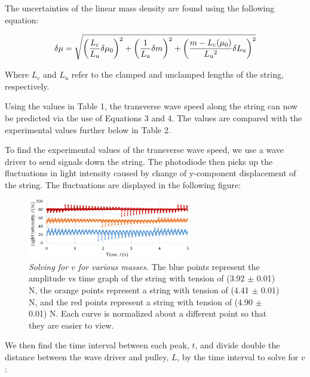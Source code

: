\documentclass[twoside,twocolumn]{article}
\begin{document}
\noindent The uncertainties of the linear mass density are found using the following equation:

\footnotesize
\begin{equation}
\delta \mu = \sqrt{\bigg (\frac{L\textsubscript{c}}{L\textsubscript{u}} \delta \mu_0 \bigg)^2 + \bigg ( \frac{1}{L\textsubscript{u}}\delta m \bigg )^2  + \bigg( \frac{m - L\textsubscript{c}(\mu_0)}{L\textsubscript{u}^2}\delta L\textsubscript{u} \bigg )^2}
\end{equation}
\normalsize

\noindent Where $L_c$ and $L_u$ refer to the clamped and unclamped lengths of the string, respectively.

\noindent Using the values in Table 1, the transverse wave speed along the string can now be predicted via the use of Equations 3 and 4. The values are compared with the experimental values further below in Table 2.

\noindent To find the experimental values of the transverse wave speed, we use a wave driver to send signals down the string. The photodiode then picks up the fluctuations in light intensity caused by change of y-component displacement of the string. The fluctuations are displayed in the following figure:

\begin{figure}[!htbp]
    \centering
    \includegraphics[width=2.8in]{LightIntensity.png}
    \caption{\textit{Solving for $v$ for various masses.} The blue points represent the amplitude vs time graph of the string with tension of (3.92 $\pm$ 0.01) N, the orange points represent a string with tension of (4.41 $\pm$ 0.01) N, and the red points represent a string with tension of (4.90 $\pm$ 0.01) N. Each curve is normalized about a different point so that they are easier to view.}
\end{figure}

\noindent We then find the time interval between each peak, $t$, and divide double the distance between the wave driver and pulley, $L$, by the time interval to solve for $v$:

\begin{table}[!htbp]
\caption{Experimental Wave Speeds}
\centering
{}
\end{table}
\end{document}
